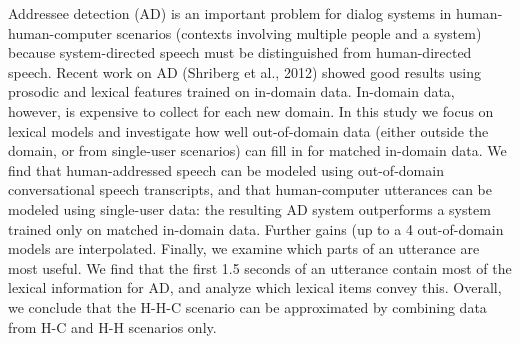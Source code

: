 Addressee detection (AD) is an important problem for dialog systems in human-human-computer scenarios (contexts involving multiple people and a
 system) because system-directed speech must be distinguished from
 human-directed speech. Recent work on AD (Shriberg et al., 2012) showed good
 results using prosodic and lexical features trained on in-domain data.
 In-domain data, however, is expensive to collect for each new domain. In this
 study we focus on lexical models and investigate how well out-of-domain data
 (either outside the domain, or from single-user scenarios) can fill in for
 matched in-domain data. We find that human-addressed speech can be modeled
 using out-of-domain conversational speech transcripts, and that human-computer
 utterances can be modeled using single-user data: the resulting AD system
 outperforms a system trained only on matched in-domain data. Further gains (up
 to a 4%
 out-of-domain models are interpolated. Finally, we examine which parts of an
 utterance are most useful. We find that the first 1.5 seconds of an utterance
 contain most of the lexical information for AD, and analyze which lexical items
 convey this. Overall, we conclude that the H-H-C scenario can be approximated
 by combining data from H-C and H-H scenarios only.

